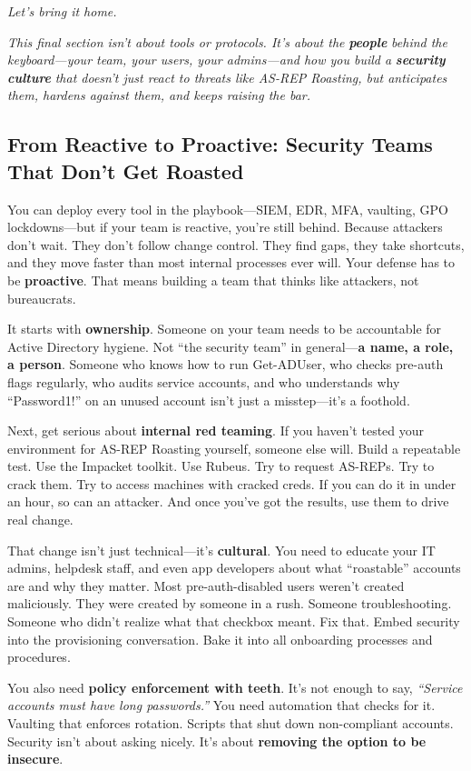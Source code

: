\textit{Let’s bring it home.}

\textit{This final section isn’t about tools or protocols. It’s about the }\textit{\textbf{people}}\textit{ behind the keyboard—your team, your users, your admins—and how you build a }\textit{\textbf{security culture}}\textit{ that doesn’t just react to threats like AS-REP Roasting, but anticipates them, hardens against them, and keeps raising the bar.}

\subsection{From Reactive to Proactive: Security Teams That Don’t Get Roasted}

You can deploy every tool in the playbook—SIEM, EDR, MFA, vaulting, GPO lockdowns—but if your team is reactive, you’re still behind. Because attackers don’t wait. They don’t follow change control. They find gaps, they take shortcuts, and they move faster than most internal processes ever will. Your defense has to be \textbf{proactive}. That means building a team that thinks like attackers, not bureaucrats.

It starts with \textbf{ownership}. Someone on your team needs to be accountable for Active Directory hygiene. Not “the security team” in general—\textbf{a name, a role, a person}. Someone who knows how to run Get-ADUser, who checks pre-auth flags regularly, who audits service accounts, and who understands why “Password1!” on an unused account isn’t just a misstep—it’s a foothold.

Next, get serious about \textbf{internal red teaming}. If you haven’t tested your environment for AS-REP Roasting yourself, someone else will. Build a repeatable test. Use the Impacket toolkit. Use Rubeus. Try to request AS-REPs. Try to crack them. Try to access machines with cracked creds. If you can do it in under an hour, so can an attacker. And once you’ve got the results, use them to drive real change.

That change isn’t just technical—it’s \textbf{cultural}. You need to educate your IT admins, helpdesk staff, and even app developers about what “roastable” accounts are and why they matter. Most pre-auth-disabled users weren’t created maliciously. They were created by someone in a rush. Someone troubleshooting. Someone who didn’t realize what that checkbox meant. Fix that. Embed security into the provisioning conversation. Bake it into all onboarding processes and procedures.

You also need \textbf{policy enforcement with teeth}. It’s not enough to say, \textit{“Service accounts must have long passwords.”} You need automation that checks for it. Vaulting that enforces rotation. Scripts that shut down non-compliant accounts. Security isn’t about asking nicely. It’s about \textbf{removing the option to be insecure}.

